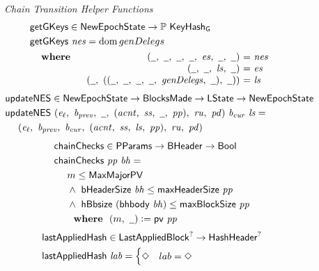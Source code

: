 \begin{figure}[htb]
  \emph{Chain Transition Helper Functions}
  \begin{align*}
      & \fun{getGKeys} \in \NewEpochState \to \powerset{\KeyHashGen} \\
      & \fun{getGKeys}~\var{nes} = \dom{genDelegs} \\
      &
      \begin{array}{lr@{~=~}l}
        \where
          & (\wcard,~\wcard,~\wcard,~\wcard,~\var{es},~\wcard,~\wcard)
          & \var{nes}
          \\
          & (\wcard,~\wcard,~\var{ls},~\wcard)
          & \var{es}
          \\
          & (\wcard,~((\wcard,~\wcard,~\wcard,~\wcard,~\var{genDelegs},~\wcard),~\wcard))
          & \var{ls}
      \end{array}
  \end{align*}
  \begin{align*}
      & \fun{updateNES} \in \NewEpochState \to \BlocksMade \to \LState \to \NewEpochState \\
      & \fun{updateNES}~
      (\var{e_\ell},~\var{b_{prev}},~\wcard,~(\var{acnt},~\var{ss},~\wcard,~\var{pp}),
       ~\var{ru},~\var{pd})
          ~\var{b_{cur}}~\var{ls} = \\
      & ~~~~
      (\var{e_\ell},~\var{b_{prev}},~\var{b_{cur}},
       ~(\var{acnt},~\var{ss},~\var{ls},~\var{pp}),~\var{ru},~\var{pd})
  \end{align*}
  \begin{align*}
      & \fun{chainChecks} \in \PParams \to \BHeader \to \Bool \\
      & \fun{chainChecks}~\var{pp}~\var{bh} = \\
      & ~~~~ m \leq \MaxMajorPV \\
      & ~~~~ \land~\bHeaderSize{bh} \leq \fun{maxHeaderSize}~\var{pp} \\
      & ~~~~ \land~\hBbsize{(\bhbody{bh})} \leq \fun{maxBlockSize}~\var{pp} \\
      & ~~~~ \where (m,~\wcard)\leteq\fun{pv}~\var{pp}
  \end{align*}
  \begin{align*}
      & \mathsf{lastAppliedHash} \in \mathsf{LastAppliedBlock}^? \to \mathsf{HashHeader}^? \\
      & \mathsf{lastAppliedHash}~\mathit{lab} =
        \begin{cases}
          \Diamond & lab = \Diamond \\

\end{cases}
\end{align*}
\end{figure}
